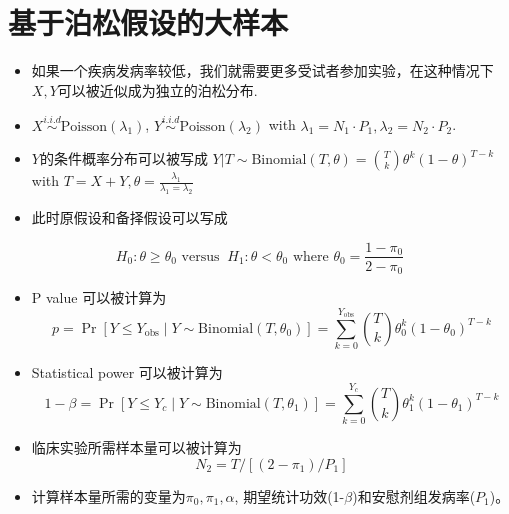 \documentclass[
]{book}
\begin{document}
\section{基于泊松假设的大样本}\label{ux57faux4e8eux6ccaux677eux5047ux8bbeux7684ux5927ux6837ux672c}

\begin{itemize}
\item
  如果一个疾病发病率较低，我们就需要更多受试者参加实验，在这种情况下\(X, Y\)可以被近似成为独立的泊松分布.
\item
  \(X \overset{i.i.d}{\sim}\text{Poisson}(\lambda_1)\), \(Y \overset{i.i.d}{\sim}\text{Poisson}(\lambda_2)\) with \(\lambda_1 = N_1\cdot P_1, \lambda_2 = N_2\cdot P_2\).
\item
  \(Y\)的条件概率分布可以被写成
  \(Y|T \sim \text{Binomial}(T, \theta)=\binom{T}{k} \theta^k(1-\theta)^{T-k}\) with \(T = X + Y, \theta = \frac{\lambda_1}{\lambda_1=\lambda_2}\)
\item
  此时原假设和备择假设可以写成
\end{itemize}

\begin{equation} 
  H_0: \theta \geq \theta_0 \text{ versus } \ H_1:\theta<\theta_0 \text{ where } \theta_0 = \frac{1-\pi_0}{2-\pi_0}
  \label{eq:hypo2}
\end{equation}

\begin{itemize}
\item
  P value 可以被计算为
  \begin{equation} 
  p = \Pr[Y \leq Y_{\text{obs}} \mid Y \sim \text{Binomial}(T, \theta_0)] = \sum_{k=0}^{Y_{\text{obs}}} \binom{T}{k} \theta_0^k (1 - \theta_0)^{T - k}
  \label{eq:pvalue}
  \end{equation}
\item
  Statistical power 可以被计算为
  \begin{equation} 
  1 - \beta = \Pr[Y \leq Y_c \mid Y \sim \text{Binomial}(T, \theta_1)] = \sum_{k=0}^{Y_c} \binom{T}{k} \theta_1^k (1 - \theta_1)^{T - k}
  \label{eq:power}
  \end{equation}
\item
  临床实验所需样本量可以被计算为
  \begin{equation} 
  N_2 = T/[(2-\pi_1)/P_1]
  \label{eq:n2}
  \end{equation}
\item
  计算样本量所需的变量为\(\pi_0, \pi_1, \alpha\), 期望统计功效(1-\(\beta\))和安慰剂组发病率(\(P_1\))。
\end{itemize}
\end{document}

